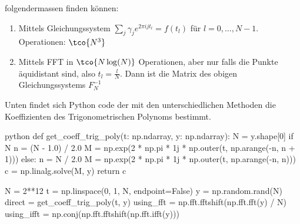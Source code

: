 \rmvspace\rmvspace
folgendermassen finden können: 
\begin{enumerate}[label=(\arabic*)]
    \item Mittels Gleichungssystem $\sum_{j} \gamma_j e^{2\pi ijt_l} = f(t_l)$ für $l = 0, \ldots, N - 1$. Operationen: $\tco{N^3}$
    \item Mittels FFT in $\tco{N \log(N)}$ Operationen, aber nur falls die Punkte äquidistant sind, also $t_l = \frac{l}{N}$.
        Dann ist die Matrix des obigen Gleichungssystems $F^{-1}_N$
\end{enumerate}

\vspace{0.2cm}

Unten findet sich Python code der mit den unterschiedlichen Methoden die Koeffizienten des Trigonometrischen Polynoms bestimmt.
\rmvspace
\begin{code}{python}
    def get_coeff_trig_poly(t: np.ndarray, y: np.ndarray):
    N = y.shape[0]
    if N %
    n = (N - 1.0) / 2.0
    M = np.exp(2 * np.pi * 1j * np.outer(t, np.arange(-n, n + 1)))
    else:
    n = N / 2.0
    M = np.exp(2 * np.pi * 1j * np.outer(t, np.arange(-n, n)))
    c = np.linalg.solve(M, y)
    return c

    N = 2**12
    t = np.linspace(0, 1, N, endpoint=False)
    y = np.random.rand(N)
    direct = get_coeff_trig_poly(t, y)
    using_fft = np.fft.fftshift(np.fft.fft(y) / N)
    using_ifft = np.conj(np.fft.fftshift(np.fft.ifft(y)))
\end{code}
